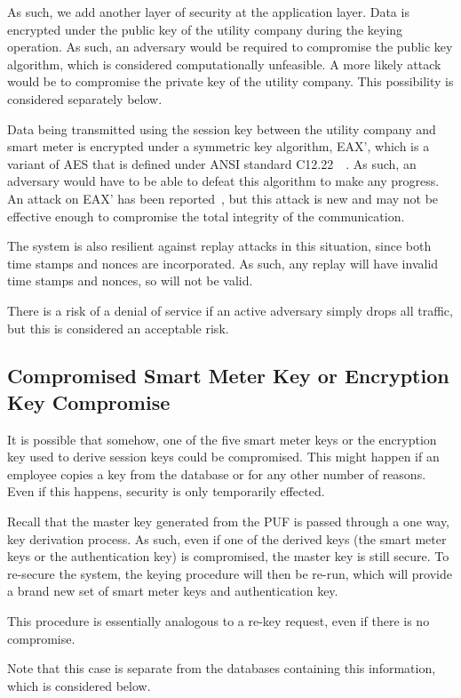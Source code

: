 As such, we add another layer of security at the application layer. Data is encrypted under the public key of the utility
company during the keying operation. As such, an adversary would be required to compromise the public key
algorithm, which is considered computationally unfeasible. A more likely attack would be to compromise the private key
of the utility company. This possibility is considered separately below.

Data being transmitted using the session key between the utility company and smart meter is encrypted under a
symmetric key algorithm, EAX', which is a variant of AES that is defined under ANSI standard 
C12.22~\cite{ansi1222}~\cite{eax}. As such, an adversary would have to be able to defeat this algorithm to make
any progress. An attack on EAX' has been reported~\cite{eaxflaw}, but this attack is new and may not be effective
enough to compromise the total integrity of the communication.

The system is also resilient against replay attacks in this situation, since both time stamps and nonces are incorporated.
As such, any replay will have invalid time stamps and nonces, so will not be valid.

There is a risk of a denial of service if an active adversary simply drops all traffic, but this is considered an acceptable
risk.

\subsection{Compromised Smart Meter Key or Encryption Key Compromise}
It is possible that somehow, one of the five smart meter keys or the encryption key used to derive session keys
could be compromised. This might happen if an employee copies a key from the database or for any other number
of reasons. Even if this happens, security is only temporarily effected.

Recall that the master key generated from the PUF is passed through a one way, key derivation process. As such,
even if one of the derived keys (the smart meter keys or the authentication key) is compromised, the master key
is still secure. To re-secure the system, the keying procedure will then be re-run, which will provide a brand new set
of smart meter keys and authentication key.

This procedure is essentially analogous to a re-key request, even if there is no compromise.

Note that this case is separate from the databases containing this information, which is considered below.

